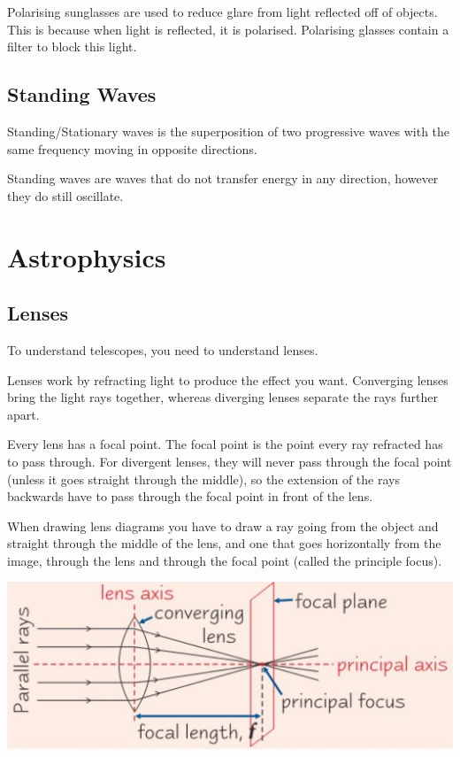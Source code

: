 \documentclass[a4paper, 12pt]{article}
\begin{document}
Polarising sunglasses are used to reduce glare from light reflected off of objects. This is because when light is reflected, it is polarised. Polarising glasses contain a filter to block this light.

\subsection{Standing Waves}

Standing/Stationary waves is the superposition of two progressive waves with the same frequency moving in opposite directions.

Standing waves are waves that do not transfer energy in any direction, however they do still oscillate.


\section{Astrophysics}

\subsection{Lenses}

To understand telescopes, you need to understand lenses.

Lenses work by refracting light to produce the effect you want. Converging lenses bring the light rays together, whereas diverging lenses separate the rays further apart.

Every lens has a focal point. The focal point is the point every ray refracted has to pass through. For divergent lenses, they will never pass through the focal point (unless it goes straight through the middle), so the extension of the rays backwards have to pass through the focal point in front of the lens.

When drawing lens diagrams you have to draw a ray going from the object and straight through the middle of the lens, and one that goes horizontally from the image, through the lens and through the focal point (called the principle focus).

\begin{center}
\includegraphics[width=\textwidth]{images/lensDiagram.png}
\end{center}
\end{document}
